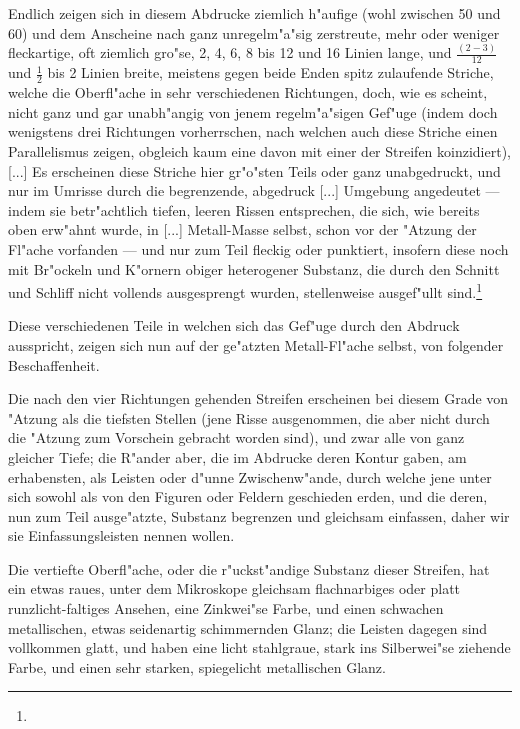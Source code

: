 \documentclass[a4paper, 11pt, oneside, german]{article}
\begin{document}
Endlich zeigen sich in diesem Abdrucke ziemlich h"aufige (wohl zwischen 50 und 60) und dem Anscheine nach ganz unregelm"a"sig zerstreute, mehr oder weniger fleckartige, oft ziemlich gro"se, 2, 4, 6, 8 bis 12 und 16 Linien lange, und $\frac{(2-3)}{12}$ und $\frac{1}{2}$ bis 2 Linien breite, meistens gegen beide Enden spitz zulaufende Striche, welche die Oberfl"ache in sehr verschiedenen Richtungen, doch, wie es scheint, nicht ganz und gar unabh"angig von jenem regelm"a"sigen Gef"uge (indem doch wenigstens drei Richtungen vorherrschen, nach welchen auch diese Striche einen Parallelismus zeigen, obgleich kaum eine davon mit einer der Streifen koinzidiert), [...] Es erscheinen diese Striche hier gr"o"sten Teils oder ganz unabgedruckt, und nur im Umrisse durch die begrenzende, abgedruck [...] Umgebung angedeutet --- indem sie betr"achtlich tiefen, leeren Rissen entsprechen, die sich, wie bereits oben erw"ahnt wurde, in [...] Metall-Masse selbst, schon vor der "Atzung der Fl"ache vorfanden --- und nur zum Teil fleckig oder punktiert, insofern diese noch mit Br"ockeln und K"ornern obiger heterogener Substanz, die durch den Schnitt und Schliff nicht vollends ausgesprengt wurden, stellenweise ausgef"ullt sind.\footnote{}

Diese verschiedenen Teile in welchen sich das Gef"uge durch den Abdruck ausspricht, zeigen sich nun auf der ge"atzten Metall-Fl"ache selbst, von folgender Beschaffenheit.

Die nach den vier Richtungen gehenden Streifen erscheinen bei diesem Grade von "Atzung als die tiefsten Stellen (jene Risse ausgenommen, die aber nicht durch die "Atzung zum Vorschein gebracht worden sind), und zwar alle von ganz gleicher Tiefe; die R"ander aber, die im Abdrucke deren Kontur gaben, am erhabensten, als Leisten oder d"unne Zwischenw"ande, durch welche jene unter sich sowohl als von den Figuren oder Feldern geschieden erden, und die deren, nun zum Teil ausge"atzte, Substanz begrenzen und gleichsam einfassen, daher wir sie Einfassungsleisten nennen wollen.

Die vertiefte Oberfl"ache, oder die r"uckst"andige Substanz dieser Streifen, hat ein etwas raues, unter dem Mikroskope gleichsam flachnarbiges oder platt runzlicht-faltiges Ansehen, eine Zinkwei"se Farbe, und einen schwachen metallischen, etwas seidenartig schimmernden Glanz; die Leisten dagegen sind vollkommen glatt, und haben eine licht stahlgraue, stark ins Silberwei"se ziehende Farbe, und einen sehr starken, spiegelicht metallischen Glanz.
\end{document}

